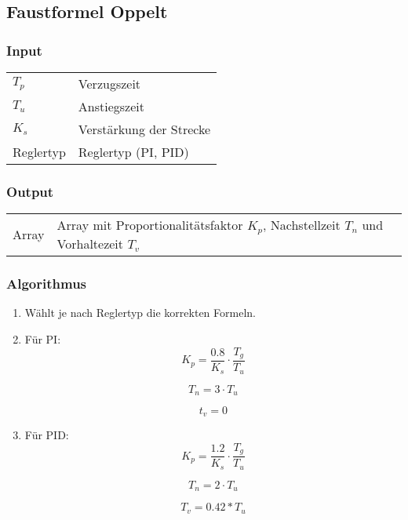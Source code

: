 \clearpage
\subsection{Faustformel Oppelt}
\label{app:algo:oppelt}

\subsubsection*{Input}

\begin{tabular}{p{40mm}l}
    $ T_p $        & Verzugszeit \\
    $ T_u $        & Anstiegszeit \\
    $ K_s $        & Verst\"arkung der Strecke \\
      Reglertyp    & Reglertyp (PI, PID)
\end{tabular}

\subsubsection*{Output}
\begin{tabular}{p{40mm}l}
    Array & \parbox[t][4em][s]{0.7\textwidth}{Array mit Proportionalit\"atsfaktor $ K_p $, Nachstellzeit $ T_n $ und Vorhaltezeit $ T_v $}
\end{tabular}

\subsubsection*{Algorithmus}
\begin{enumerate}
    \item
        W\"ahlt je nach Reglertyp die korrekten Formeln.
    \item
        F\"ur PI:
        \begin{equation*}
             K_p= \frac{0.8}{K_s} \cdot \frac{T_g}{T_u}
        \end{equation*}

        \begin{equation*}
             T_n=3 \cdot T_u
        \end{equation*}

        \begin{equation*}
              t_v=0
        \end{equation*}
    \item
        F\"ur PID:
        \begin{equation*}
            K_p = \frac{1.2}{K_s} \cdot \frac{T_g}{T_u}
        \end{equation*}

        \begin{equation*}
            T_n=2 \cdot T_u
        \end{equation*}

        \begin{equation*}
            T_v=0.42*T_u
        \end{equation*}
\end{enumerate}

